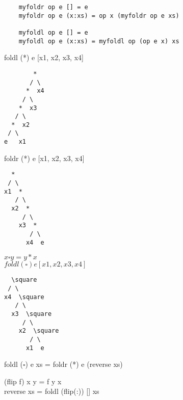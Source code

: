 \documentclass{article}
\begin{document}
\begin{verbatim}
    myfoldr op e [] = e
    myfoldr op e (x:xs) = op x (myfoldr op e xs)
    
    myfoldl op e [] = e 
    myfoldl op e (x:xs) = myfoldl op (op e x) xs
\end{verbatim}

foldl (*) e [x1, x2, x3, x4]
\begin{verbatim}
        *
       / \
      *  x4
     / \
    *  x3
   / \
  *  x2
 / \
e   x1
\end{verbatim}
foldr (*) e [x1, x2, x3, x4]
\begin{verbatim}
  *
 / \
x1  *
   / \
  x2  *
     / \
    x3  *
       / \
      x4  e

\end{verbatim}
$x \square y = y * x$ \\
$foldl (\square) e [x1, x2, x3, x4]$
\begin{verbatim}
  \square
 / \
x4  \square
   / \
  x3  \square
     / \
    x2  \square
       / \
      x1  e
\end{verbatim}

\noindent
foldl ($\square$) e xs = foldr (*) e (reverse xs)

\noindent
(flip f) x y = f y x \\
reverse xs = foldl (flip(:)) [] xs
\end{document}
